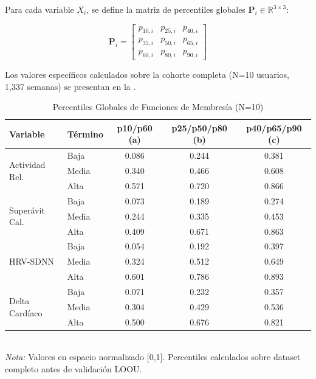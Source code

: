 Para cada variable \(X_i\), se define la matriz de percentiles globales \(\mathbf{P}_i \in \mathbb{R}^{3 \times 3}\):

\begin{equation}
\mathbf{P}_i = \begin{bmatrix}
p_{10,i} & p_{25,i} & p_{40,i} \\
p_{35,i} & p_{50,i} & p_{65,i} \\
p_{60,i} & p_{80,i} & p_{90,i}
\end{bmatrix}
\label{eq:matriz_percentiles}
\end{equation}

Los valores específicos calculados sobre la cohorte completa (N=10 usuarios, 1,337 semanas) se presentan en la .

\begin{table}[H]
\centering
\caption{Percentiles Globales de Funciones de Membresía (N=10)}
\label{tab:percentiles_globales}
\small
\begin{tabular}{@{}llccc@{}}
\toprule
\textbf{Variable} & \textbf{Término} & \textbf{p10/p60 (a)} & \textbf{p25/p50/p80 (b)} & \textbf{p40/p65/p90 (c)} \\
\midrule
\multirow{3}{*}{Actividad Rel.} & Baja  & 0.086 & 0.244 & 0.381 \\
                                  & Media & 0.340 & 0.466 & 0.608 \\
                                  & Alta  & 0.571 & 0.720 & 0.866 \\
\midrule
\multirow{3}{*}{Superávit Cal.} & Baja  & 0.073 & 0.189 & 0.274 \\
                                 & Media & 0.244 & 0.335 & 0.453 \\
                                 & Alta  & 0.409 & 0.671 & 0.863 \\
\midrule
\multirow{3}{*}{HRV-SDNN}       & Baja  & 0.054 & 0.192 & 0.397 \\
                                 & Media & 0.324 & 0.512 & 0.649 \\
                                 & Alta  & 0.601 & 0.786 & 0.893 \\
\midrule
\multirow{3}{*}{Delta Cardíaco} & Baja  & 0.071 & 0.232 & 0.357 \\
                                 & Media & 0.304 & 0.429 & 0.536 \\
                                 & Alta  & 0.500 & 0.676 & 0.821 \\
\bottomrule
\end{tabular}
\\[5pt]
\footnotesize{\textit{Nota:} Valores en espacio normalizado [0,1]. Percentiles calculados sobre dataset completo antes de validación LOOU.}
\end{table}

